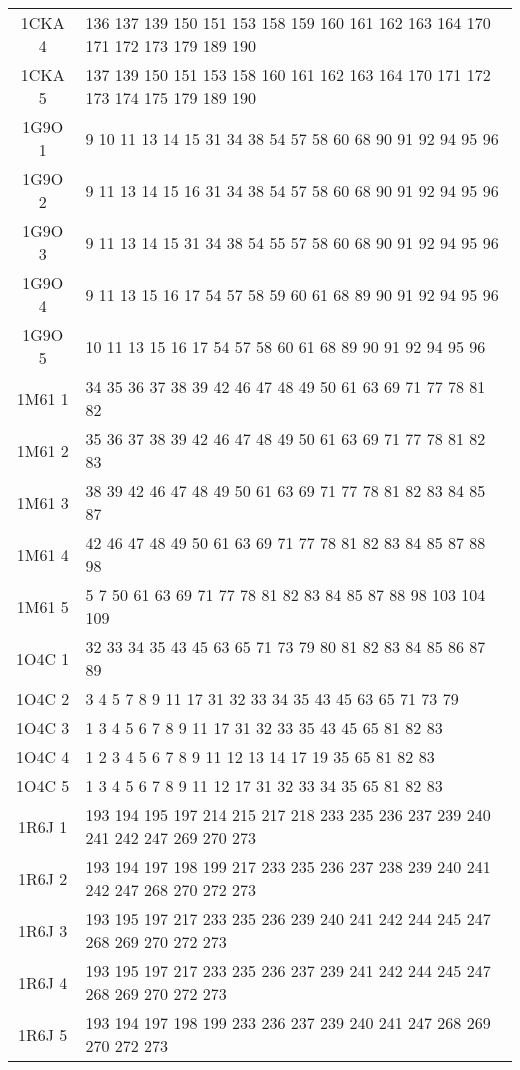 \begin{table}[!htbp]
{\begin{tabular}{cl}
      1CKA 4 & 136 137 139 150 151 153 158 159 160 161 162 163 164 170 171 172 173 179 189 190 \\
      1CKA 5 & 137 139 150 151 153 158 160 161 162 163 164 170 171 172 173 174 175 179 189 190 \\
      1G9O 1 & 9 10 11 13 14 15 31 34 38 54 57 58 60 68 90 91 92 94 95 96 \\
      1G9O 2 & 9 11 13 14 15 16 31 34 38 54 57 58 60 68 90 91 92 94 95 96 \\
      1G9O 3 & 9 11 13 14 15 31 34 38 54 55 57 58 60 68 90 91 92 94 95 96 \\
      1G9O 4 & 9 11 13 15 16 17 54 57 58 59 60 61 68 89 90 91 92 94 95 96 \\
      1G9O 5 & 10 11 13 15 16 17 54 57 58 60 61 68 89 90 91 92 94 95 96 \\
      1M61 1 & 34 35 36 37 38 39 42 46 47 48 49 50 61 63 69 71 77 78 81 82 \\
      1M61 2 & 35 36 37 38 39 42 46 47 48 49 50 61 63 69 71 77 78 81 82 83 \\
      1M61 3 & 38 39 42 46 47 48 49 50 61 63 69 71 77 78 81 82 83 84 85 87 \\
      1M61 4 & 42 46 47 48 49 50 61 63 69 71 77 78 81 82 83 84 85 87 88 98 \\
      1M61 5 & 5 7 50 61 63 69 71 77 78 81 82 83 84 85 87 88 98 103 104 109 \\
      1O4C 1 & 32 33 34 35 43 45 63 65 71 73 79 80 81 82 83 84 85 86 87 89 \\
      1O4C 2 & 3 4 5 7 8 9 11 17 31 32 33 34 35 43 45 63 65 71 73 79 \\
      1O4C 3 & 1 3 4 5 6 7 8 9 11 17 31 32 33 35 43 45 65 81 82 83 \\
      1O4C 4 & 1 2 3 4 5 6 7 8 9 11 12 13 14 17 19 35 65 81 82 83 \\
      1O4C 5 & 1 3 4 5 6 7 8 9 11 12 17 31 32 33 34 35 65 81 82 83 \\
      1R6J 1 & 193 194 195 197 214 215 217 218 233 235 236 237 239 240 241 242 247 269 270 273 \\
      1R6J 2 & 193 194 197 198 199 217 233 235 236 237 238 239 240 241 242 247 268 270 272 273 \\
      1R6J 3 & 193 195 197 217 233 235 236 239 240 241 242 244 245 247 268 269 270 272 273 \\
      1R6J 4 & 193 195 197 217 233 235 236 237 239 241 242 244 245 247 268 269 270 272 273 \\
      1R6J 5 & 193 194 197 198 199 233 236 237 239 240 241 247 268 269 270 272 273 \\

\end{tabular}}
\end{table}
